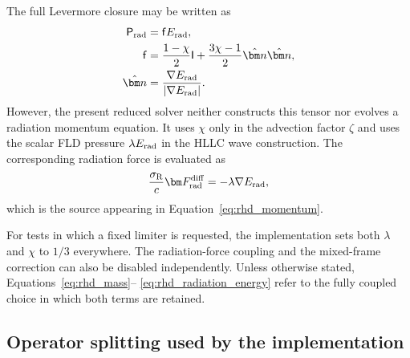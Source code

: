 The full Levermore closure may be written as
\begin{align}
    {\sf P}_{\rm rad}
    &={\sf f}E_{\rm rad},\\
    {\sf f}
    &=\frac{1-\chi}{2}{\sf I}
      +\frac{3\chi-1}{2}\hat{\bm n}\hat{\bm n},\\
    \hat{\bm n}
    &=\frac{\nabla E_{\rm rad}}{|\nabla E_{\rm rad}|}.
    \label{eq:levermore_eddington_tensor}
\end{align}
However, the present reduced solver neither constructs this tensor nor
evolves a radiation momentum equation.  It uses $\chi$ only in the advection
factor $\zeta$ and uses the scalar FLD pressure $\lambda E_{\rm rad}$ in the
HLLC wave construction.  The corresponding radiation force is evaluated as
\begin{align}
    \frac{\sigma_{\rm R}}{c}\bm F_{\rm rad}^{\rm diff}
    =-\lambda\nabla E_{\rm rad},
    \label{eq:radiation_force}
\end{align}
which is the source appearing in Equation~\eqref{eq:rhd_momentum}.

For tests in which a fixed limiter is requested, the implementation sets both
$\lambda$ and $\chi$ to $1/3$ everywhere.  The radiation-force coupling and
the mixed-frame correction can also be disabled independently.  Unless
otherwise stated, Equations~\eqref{eq:rhd_mass}--
\eqref{eq:rhd_radiation_energy} refer to the fully coupled choice in which
both terms are retained.

\subsection{Operator splitting used by the implementation}
\label{sec:fld_operator_split}

